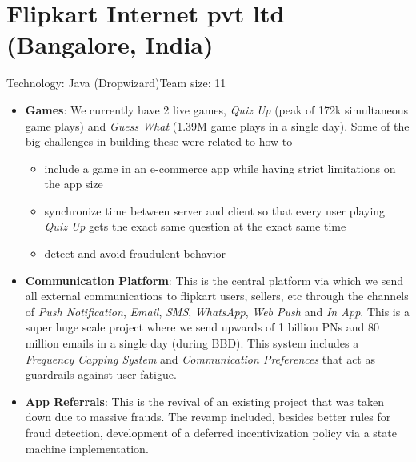 \documentclass[11pt,a4paper,sans]{moderncv} %
\begin{document}
\section{Flipkart Internet pvt ltd (Bangalore, India)}
         {Technology: Java (Dropwizard)}{Team size: 11}
         {\begin{itemize}
           \item \textbf{Games}: We currently have 2 live games, \textit{Quiz Up} (peak of 172k simultaneous game plays) and \textit{Guess What} (1.39M game plays in a single day). Some of the big challenges in building these were related to how to
           \begin{itemize}
           \item include a game in an e-commerce app while having strict limitations on the app size
           \item synchronize time between server and client so that every user playing \textit{Quiz Up} gets the exact same question at the exact same time
           \item detect and avoid fraudulent behavior
           \end{itemize}
           \item \textbf{Communication Platform}: This is the central platform via which we send all external communications to flipkart users, sellers, etc through the channels of \textit{Push Notification}, \textit{Email},  \textit{SMS}, \textit{WhatsApp}, \textit{Web Push} and \textit{In App}. This is a super huge scale project where we send upwards of 1 billion PNs and 80 million emails in a single day (during BBD). This system includes a \textit{Frequency Capping System} and \textit{Communication Preferences} that act as guardrails against user fatigue.
           \item \textbf{App Referrals}: This is the revival of an existing project that was taken down due to massive frauds. The revamp included, besides better rules for fraud detection, development of a deferred incentivization policy via a state machine implementation.
           \end{itemize}}
\end{document}
